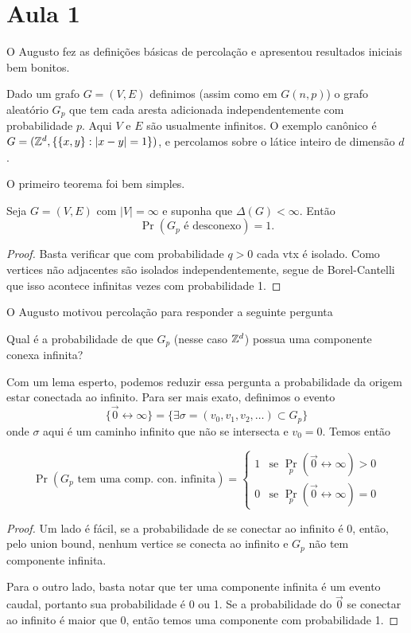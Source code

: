 \section{Aula 1}

O Augusto fez as definições básicas de percolação
e apresentou resultados iniciais bem bonitos.

Dado um grafo $G = (V,E)$ definimos (assim como em $G(n,p)$)
o grafo aleatório $G_p$ que tem cada aresta adicionada
independentemente com probabilidade $p$. Aqui $V$ e $E$ são usualmente
infinitos. O exemplo canônico é $G = (\mathbb{Z}^d, \{\{x,y\} : |x - y| = 1\})$,
e percolamos sobre o látice inteiro de dimensão $d$.

O primeiro teorema foi bem simples.
\begin{theorem}
	Seja $G = (V,E)$ com $|V| = \infty$ e suponha que $\Delta(G) < \infty$. Então
	$$\Pr(G_p \text{ é desconexo}) = 1.$$
\end{theorem}
\begin{proof}
	Basta verificar que com probabilidade $q>0$ cada vtx é isolado.
	Como vertices não adjacentes são isolados independentemente, segue
	de Borel-Cantelli que
	isso acontece infinitas vezes com probabilidade 1.
\end{proof}

O Augusto motivou percolação para responder a seguinte pergunta
\begin{question}
	Qual é a probabilidade de que $G_p$ (nesse caso $\mathbb{Z}^d$)
	possua uma componente conexa infinita?
\end{question}

Com um lema esperto, podemos reduzir essa pergunta a probabilidade da origem
estar conectada ao infinito. Para ser mais exato, definimos o evento
\[
	\{\vec{0} \leftrightarrow \infty\} = \{\exists \sigma = (v_0, v_1,
	v_2, \dots) \subset G_p\}
\]
onde $\sigma$ aqui é um caminho infinito que não se intersecta e $v_0
= 0$. Temos então
\begin{lemma}
	\[
		\Pr(G_p \text{ tem uma comp. con. infinita}) =
		\begin{cases}
			1 & \text{se } \Pr_p(\vec{0} \leftrightarrow \infty) > 0 \\
			0 & \text{se } \Pr_p(\vec{0} \leftrightarrow \infty) = 0
		\end{cases}
	\]
\end{lemma}
\begin{proof}
	Um lado é fácil, se a probabilidade de se conectar ao infinito é
	$0$, então, pelo
	union bound, nenhum vertice se conecta ao infinito e $G_p$ não tem
	componente infinita.

	Para o outro lado, basta notar que ter uma componente infinita é um
	evento caudal,
	portanto sua probabilidade é 0 ou 1. Se a probabilidade do
	$\vec{0}$ se conectar
	ao infinito é maior que $0$, então temos uma componente com probabilidade 1.
\end{proof}

